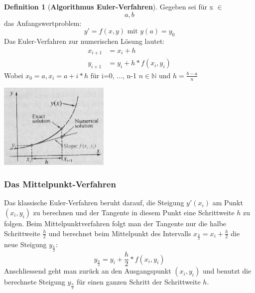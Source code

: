 \documentclass{article}
\newenvironment{Figure}
	{\par\medskip\noindent\minipage{\linewidth}}
	{\endminipage\par\medskip}
\theoremstyle{satz}
\theoremstyle{definition}
\newtheorem{definition}{Definition}
\begin{document}
\begin{tcolorbox}
\begin{definition}[\textbf{Algorithmus Euler-Verfahren}]
Gegeben sei für x $\in$ \[a,b\] das Anfangswertproblem:
\begin{equation}
y' = f(x,y) \textrm{ mit } y(a)=y_0
\end{equation}
Das Euler-Verfahren zur numerischen Lösung lautet:
\begin{equation}
\begin{split}
x_{i+1} &= x_i + h\\
y_{i+1} &= y_i + h * f(x_i, y_i)
\end{split}
\end{equation}
Wobei $x_0 = a, x_i = a+i*h$ für i=0, ..., n-1 $n \in\mathbb{N}$ und $h = \frac{b-a}{n}$ 
\end{definition}
\end{tcolorbox} 
\begin{Figure}
\centering
\includegraphics[width=200px]{img/KlassischeEulerVerfahren.png}
	\label{fig:Beispiel für das klassische Euler-Verfahren}
\end{Figure}

\subsubsection{Das Mittelpunkt-Verfahren}
Das klassische Euler-Verfahren beruht darauf, die Steigung $y'(x_i)$ am Punkt $(x_i,y_i)$ zu berechnen und der Tangente in diesem Punkt eine Schrittweite $h$ zu folgen. Beim Mittelpunktverfahren folgt man der Tangente nur die halbe Schrittweite $\frac{h}{2}$ und berechnet beim Mittelpunkt des Intervalls $x_{\frac{h}{2}} = x_i + \frac{h}{2}$ die neue Steigung $y_{\frac{h}{2}}$:
\begin{equation}
y_{\frac{h}{2}} = y_i + \frac{h}{2}*f(x_i, y_i)
\end{equation}
Anschliessend geht man zurück an den Ausgangspunkt $(x_i, y_i)$ und benutzt die berechnete Steigung $y_{\frac{h}{2}}$ für einen ganzen Schritt der Schrittweite $h$.
\end{document}
